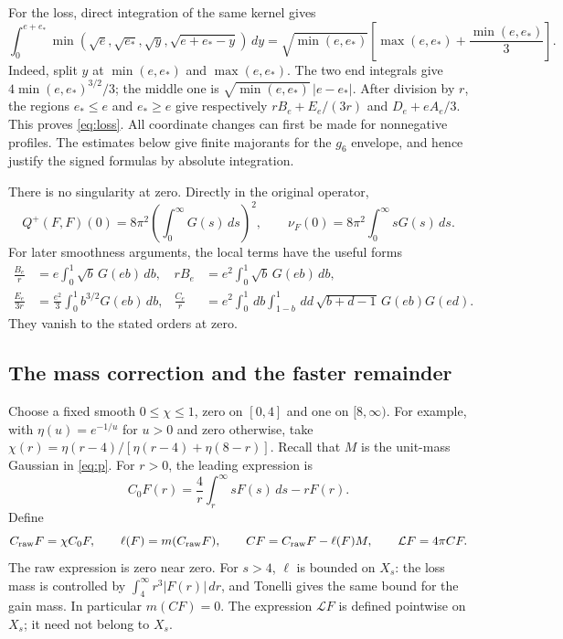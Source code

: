 \documentclass[11pt,a4paper]{article}
\numberwithin{equation}{section}
\theoremstyle{remark}
\newcommand{\calL}{\mathcal L}
\newcommand{\dd}{\,d}
\begin{document}
For the loss, direct integration of the same kernel gives
\[
 \int_0^{e+e_*}
 \min(\sqrt e,\sqrt{e_*},\sqrt y,\sqrt{e+e_*-y})\dd y
 =\sqrt{\min(e,e_*)}
   \left[\max(e,e_*)+\frac{\min(e,e_*)}{3}\right].
\]
Indeed, split \(y\) at \(\min(e,e_*)\) and \(\max(e,e_*)\).
The two end integrals give \(4\min(e,e_*)^{3/2}/3\); the middle one
is \(\sqrt{\min(e,e_*)}\,|e-e_*|\).
After division by \(r\), the regions \(e_*\leq e\) and \(e_*\geq e\)
give respectively \(rB_e+E_e/(3r)\) and \(D_e+eA_e/3\).
This proves \eqref{eq:loss}.
All coordinate changes can first be made for nonnegative profiles.
The estimates below give finite majorants for the \(g_6\) envelope,
and hence justify the signed formulas by absolute integration.

There is no singularity at zero. Directly in the original operator,
\[
 Q^+(F,F)(0)=8\pi^2\left(\int_0^\infty G(s)\dd s\right)^2,\qquad
 \nu_F(0)=8\pi^2\int_0^\infty sG(s)\dd s.
\]
For later smoothness arguments, the local terms have the useful forms
\begin{align}
 \frac{B_e}{r}
   &=e\int_0^1\sqrt b\,G(eb)\dd b,&
 rB_e&=e^2\int_0^1\sqrt b\,G(eb)\dd b,\nonumber\\
 \frac{E_e}{3r}
   &=\frac{e^2}{3}\int_0^1b^{3/2}G(eb)\dd b,&
 \frac{C_e}{r}
   &=e^2\int_0^1\dd b\int_{1-b}^1\dd d\,
       \sqrt{b+d-1}\,G(eb)G(ed).\label{eq:origin}
\end{align}
They vanish to the stated orders at zero.

\subsection*{The mass correction and the faster remainder}
Choose a fixed smooth \(0\leq\chi\leq1\), zero on \([0,4]\) and one on
\([8,\infty)\). For example, with \(\eta(u)=e^{-1/u}\) for \(u>0\) and
zero otherwise, take
\(\chi(r)=\eta(r-4)/[\eta(r-4)+\eta(8-r)]\).
Recall that \(M\) is the unit-mass Gaussian in \eqref{eq:p}.
For \(r>0\), the leading expression is
\[
 C_0F(r)=\frac4r\int_r^\infty sF(s)\dd s-rF(r).
\]
Define
\begin{equation}\label{eq:cold}
 C_{\rm raw}F=\chi C_0F,\qquad
 \ell(F)=m(C_{\rm raw}F),\qquad
 CF=C_{\rm raw}F-\ell(F)M,\qquad \calL F=4\pi CF.
\end{equation}
The raw expression is zero near zero. For \(s>4\), \(\ell\) is bounded
on \(X_s\): the loss mass is controlled by
\(\int_4^\infty r^3|F(r)|\dd r\), and Tonelli gives the same bound for
the gain mass. In particular \(m(CF)=0\). The expression \(\calL F\)
is defined pointwise on \(X_s\); it need not belong to \(X_s\).
\end{document}
